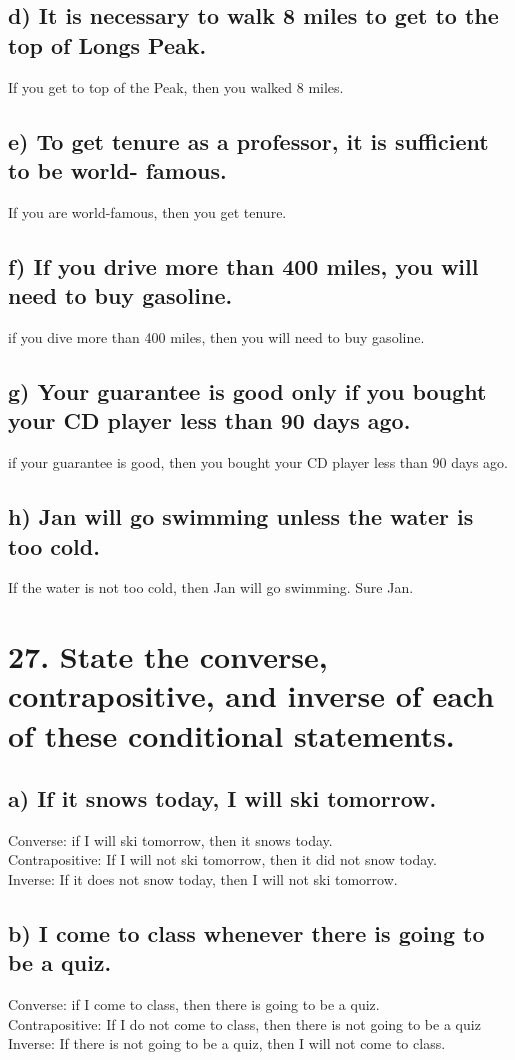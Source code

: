 \documentclass[11pt, oneside]{article} %
\numberwithin{equation}{section} %
\numberwithin{figure}{section} %
\begin{document}
\subsection{d) It is necessary to walk 8 miles to get to the top of
Longs Peak.}
If you get to top of the Peak, then you walked 8 miles.
\subsection{e) To get tenure as a professor, it is sufficient to be world-
famous.}
If you are world-famous, then you get tenure.
\subsection{f) If you drive more than 400 miles, you will need to buy
gasoline.}
if you dive more than 400 miles, then you will need to buy gasoline.
\subsection{g) Your guarantee is good only if you bought your CD
player less than 90 days ago.}
if your guarantee is good, then you bought your CD player less than 90 days ago.
\subsection{h) Jan will go swimming unless the water is too cold.}
If the water is not too cold, then Jan will go swimming. Sure Jan. 

\section{27. State the converse, contrapositive, and inverse of each of
these conditional statements.}
\subsection{a) If it snows today, I will ski tomorrow.}
Converse: if I will ski tomorrow, then it snows today.\\
Contrapositive: If I will not ski tomorrow, then it did not snow today.\\
Inverse: If it does not snow today, then I will not ski tomorrow.
\subsection{b) I come to class whenever there is going to be a quiz.}
Converse: if I come to class, then there is going to be a quiz.\\
Contrapositive: If I do not come to class, then there is not going to be a quiz\\
Inverse: If there is not going to be a quiz, then I will not come to class.
\end{document}
